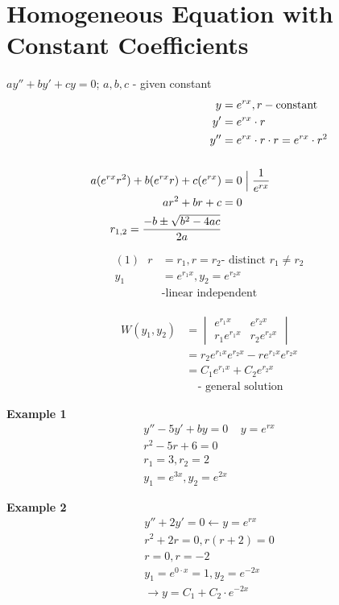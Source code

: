\documentclass[10pt, letterpaper]{article}
\begin{document}
\section{Homogeneous Equation with Constant Coefficients}
$ay'' + by' + cy = 0$; $a, b, c$ - given constant\\
\begin{align*}
y &= e^{rx}, r-\text{constant}\\
y' &= e^{rx} \cdot r\\
y'' &= e^{rx} \cdot r \cdot r = e^{rx} \cdot r^2\\
\\
a(e^{rx}r^2) + b(e^{rx}r) + c(e^{rx}) &= 0 \Bigm | \frac{1}{e^{rx}}\\
ar^2 + br + c &= 0\\
r_{1, 2} = \frac{-b \pm \sqrt{b^2 - 4ac}}{2a}
\end{align*}

\begin{align*}
(1)~~~r&=r_1, r=r_2 \text{- distinct } r_1 \neq r_2\\
y_1 &= e^{r_1x}, y_2 = e^{r_2x}\\
&\text{-linear independent}
\end{align*}

\begin{align*}
W(y_1, y_2) &=
\begin{vmatrix}
e^{r_1x} & e^{r_2x}\\
r_1e^{r_1x} & r_2e^{r_2x}
\end{vmatrix}\\
&= r_2e^{r_1x}e^{r_2x} - re^{r_1x}e^{r_2x}\\
&= C_1e^{r_1x} + C_2e^{r_2x}\\
&~~~~~\text{- general solution}
\end{align*}

\textbf{Example 1}\\
\begin{align*}
y''-5y'+by = 0 ~~~~~ y=e^{rx}\\
r^2 -5r +6 =0\\
r_1=3, r_2=2\\
y_1=e^{3x}, y_2=e^{2x}
\end{align*}

\textbf{Example 2}
\begin{align*}
y'' +2y' =0 \leftarrow y=e^{rx}\\
r^2 +2r =0, r(r+2)=0\\
r=0, r=-2\\
y_1 = e^{0 \cdot x} = 1, y_2=e^{-2x}\\
\rightarrow y =C_1 +C_2 \cdot e^{-2x}\\
\end{align*}
\end{document}

